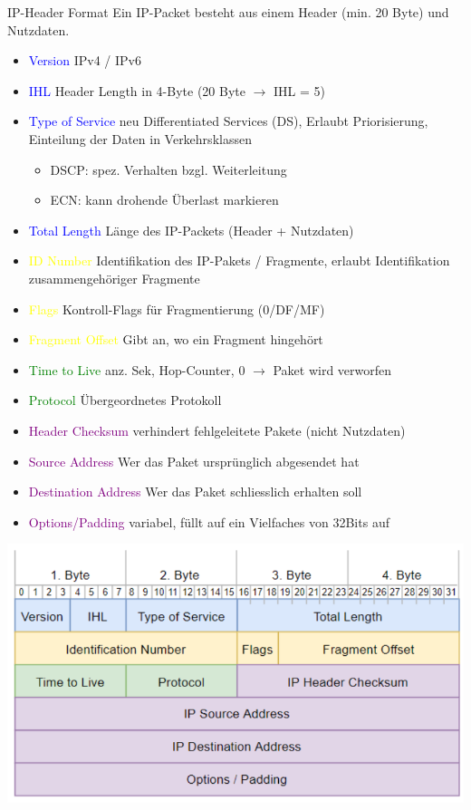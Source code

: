 \begin{KR}{IP-Header Format}
    Ein IP-Packet besteht aus einem Header (min. 20 Byte) und Nutzdaten.
    \begin{itemize}
        \item \textcolor{blue}{Version} IPv4 / IPv6
        \item \textcolor{blue}{IHL} Header Length in 4-Byte (20 Byte $\rightarrow$ IHL = 5)
        \item \textcolor{blue}{Type of Service} neu Differentiated Services (DS), Erlaubt Priorisierung, Einteilung der Daten in Verkehrsklassen
        \begin{itemize}
            \item DSCP: spez. Verhalten bzgl. Weiterleitung
            \item ECN: kann drohende Überlast markieren
        \end{itemize}
        \item \textcolor{blue}{Total Length} Länge des IP-Packets (Header + Nutzdaten)
        \item \textcolor{yellow}{ID Number} Identifikation des IP-Pakets / Fragmente, erlaubt Identifikation zusammengehöriger Fragmente
        \item \textcolor{yellow}{Flags} Kontroll-Flags für Fragmentierung (0/DF/MF)
        \item \textcolor{yellow}{Fragment Offset} Gibt an, wo ein Fragment hingehört
        \item \textcolor{green}{Time to Live} anz. Sek, Hop-Counter, 0 $\rightarrow$ Paket wird verworfen
        \item \textcolor{green}{Protocol} Übergeordnetes Protokoll
        \item \textcolor{purple}{Header Checksum} verhindert fehlgeleitete Pakete (nicht Nutzdaten)
        \item \textcolor{purple}{Source Address} Wer das Paket ursprünglich abgesendet hat
        \item \textcolor{purple}{Destination Address} Wer das Paket schliesslich erhalten soll
        \item \textcolor{purple}{Options/Padding} variabel, füllt auf ein Vielfaches von 32Bits auf
    \end{itemize}
        \includegraphics[width=1\linewidth]{images/internet_protokoll_format_ip.png}\\

\end{KR}
